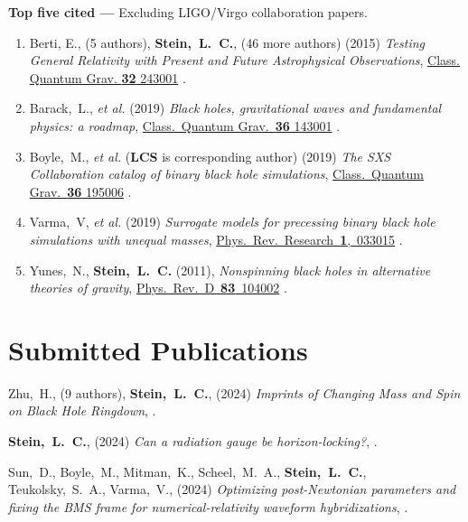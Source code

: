 {\bf Top five cited ---}%
Excluding LIGO/Virgo collaboration papers.
\begin{enumerate}
\item
  Berti, E., (5 authors), {\bf Stein,~L.~C.}, (46 more authors)
  (2015)
  {\it Testing General Relativity with Present and Future
    Astrophysical Observations},
  \href{http://dx.doi.org/10.1088/0264-9381/32/24/243001}{Class. Quantum Grav. {\bf 32} 243001}
  .
\item
  Barack,~L., {\it et al.}
  (2019)
  {\it Black holes, gravitational waves and fundamental physics: a roadmap},
  \href{https://doi.org/10.1088/1361-6382/ab0587}{Class.~Quantum Grav.~{\bf 36} 143001}
  .
\item
  Boyle,~M., {\it et al.} ({\bf LCS} is corresponding author)
  (2019)
  {\it The SXS Collaboration catalog of binary black hole simulations},
  \href{https://doi.org/10.1088/1361-6382/ab34e2}{Class.~Quantum Grav.~{\bf 36} 195006}
  .
\item
  Varma,~V, {\it et al.}
  (2019)
  {\it Surrogate models for precessing binary black hole simulations with
  unequal masses},
  \href{https://doi.org/10.1103/PhysRevResearch.1.033015}{Phys.~Rev.~Research~{\bf 1},~033015}
  .
\item
  Yunes,~N., {\bf Stein,~L.~C.}
  (2011),
  {\it Nonspinning black holes in alternative theories of gravity},
  \href{http://dx.doi.org/10.1103/PhysRevD.83.104002}{Phys.~Rev.~D~{\bf 83}~104002}
  .
\end{enumerate}
\else%
\fi

\renewcommand{\citeCount}[1]{}

\section{\sc Submitted Publications}
\begin{etaremune}[start=\value{pubCounter}]
\item
  Zhu,~H.,
  (9 authors),
  {\bf Stein,~L.~C.},
  (2024)
  {\it Imprints of Changing Mass and Spin on Black Hole Ringdown},
  .
  \citeCount{0}
\item
  {\bf Stein,~L.~C.},
  (2024)
  {\it Can a radiation gauge be horizon-locking?},
  .
  \citeCount{0}
\item
  Sun,~D.,
  Boyle,~M.,
  Mitman,~K.,
  Scheel,~M.~A.,
  {\bf Stein,~L.~C.},
  Teukolsky,~S.~A.,
  Varma,~V.,
  (2024)
  {\it Optimizing post-Newtonian parameters and fixing the BMS frame for numerical-relativity waveform hybridizations},
  .
  \citeCount{0}
  \setcounter{pubCounter}{\value{enumi}}
\end{etaremune}

